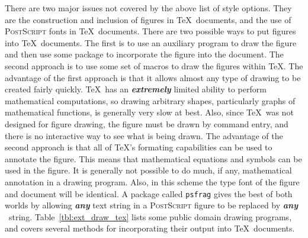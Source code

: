 \documentclass[11pt,titlepage]{article}
\begin{document}
There are two major issues not covered by the above list of style options.
They are the construction and inclusion of figures in \TeX\ documents, and the
use of \textsc{PostScript} fonts in \TeX\ documents.  There are two possible
ways to put figures into \TeX\ documents.  The first is to use an auxiliary
program to draw the figure and then use some package to incorporate the figure
into the document.  The second approach is to use some set of macros to draw
the figures within \TeX.  The advantage of the first approach is that it
allows almost any type of drawing to be created fairly quickly.  \TeX\ has an
\textbf{\textit{extremely}} limited ability to perform mathematical
computations, so drawing arbitrary shapes, particularly graphs of mathematical
functions, is generally very slow at best.  Also, since \TeX\ was not designed
for figure drawing, the figure must be drawn by command entry, and there is no
interactive way to see what is being drawn.  The advantage of the second
approach is that all of \TeX 's formating capabilities can be used to annotate
the figure.  This means that mathematical equations and symbols can be used in
the figure.  It is generally not possible to do much, if any, mathematical
annotation in a drawing program.  Also, in this scheme the type font of the
figure and document will be identical.  A package called \texttt{psfrag} gives
the best of both worlds by allowing \textbf{\textit{any}} text string in a
\textsc{PostScript} figure to be replaced by \textbf{\textit{any}} \LaTeXe\ 
string.  Table~\ref{tbl:ext_draw_tex} lists some public domain drawing
programs, and covers several methods for incorporating their output into \TeX\ 
documents.
%
\end{document}
